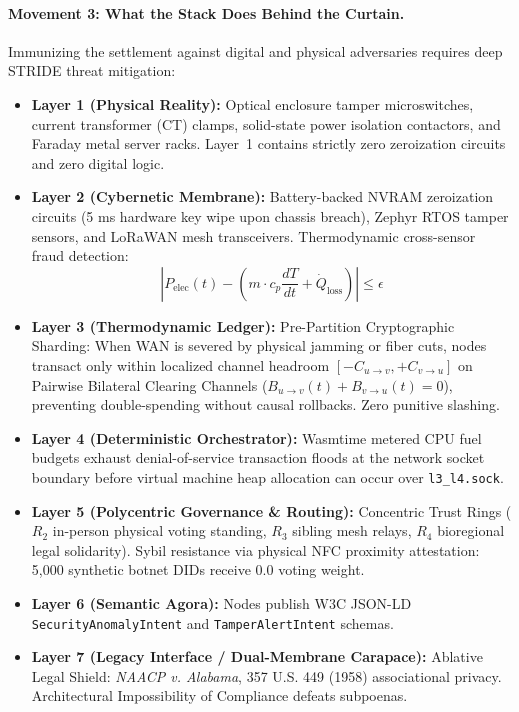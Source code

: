 \paragraph{Movement 3: What the Stack Does Behind the Curtain.}
Immunizing the settlement against digital and physical adversaries requires deep STRIDE threat mitigation:
\begin{itemize}
    \item \textbf{Layer 1 (Physical Reality):} Optical enclosure tamper microswitches, current transformer (CT) clamps, solid-state power isolation contactors, and Faraday metal server racks. Layer~1 contains strictly zero zeroization circuits and zero digital logic.
    \item \textbf{Layer 2 (Cybernetic Membrane):} Battery-backed NVRAM zeroization circuits (5 ms hardware key wipe upon chassis breach), Zephyr RTOS tamper sensors, and LoRaWAN mesh transceivers. Thermodynamic cross-sensor fraud detection:
    \[
    \left| P_{\mathrm{elec}}(t) - \left( m \cdot c_p \frac{dT}{dt} + \dot{Q}_{\mathrm{loss}} \right) \right| \le \epsilon
    \]
    \item \textbf{Layer 3 (Thermodynamic Ledger):} Pre-Partition Cryptographic Sharding: When WAN is severed by physical jamming or fiber cuts, nodes transact only within localized channel headroom $[-C_{u \to v}, +C_{v \to u}]$ on Pairwise Bilateral Clearing Channels ($B_{u \to v}(t) + B_{v \to u}(t) = 0$), preventing double-spending without causal rollbacks. Zero punitive slashing.
    \item \textbf{Layer 4 (Deterministic Orchestrator):} Wasmtime metered CPU fuel budgets exhaust denial-of-service transaction floods at the network socket boundary before virtual machine heap allocation can occur over \texttt{l3\_l4.sock}.
    \item \textbf{Layer 5 (Polycentric Governance \& Routing):} Concentric Trust Rings ($R_2$ in-person physical voting standing, $R_3$ sibling mesh relays, $R_4$ bioregional legal solidarity). Sybil resistance via physical NFC proximity attestation: 5,000 synthetic botnet DIDs receive 0.0 voting weight.
    \item \textbf{Layer 6 (Semantic Agora):} Nodes publish W3C JSON-LD \texttt{SecurityAnomalyIntent} and \texttt{TamperAlertIntent} schemas.
    \item \textbf{Layer 7 (Legacy Interface / Dual-Membrane Carapace):} Ablative Legal Shield: \textit{NAACP v. Alabama}, 357 U.S. 449 (1958) associational privacy. Architectural Impossibility of Compliance defeats subpoenas.
\end{itemize}

